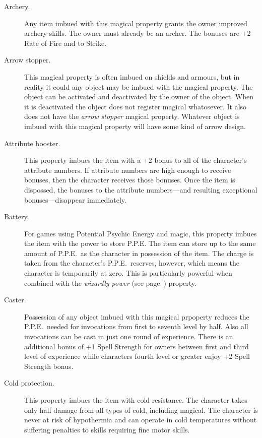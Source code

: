 \begin{description}
\item[Archery.]
Any item imbued with this magical
property grants the owner improved
archery skills.
The owner must already be an archer.
The bonuses are +2 Rate of Fire and to
Strike.

\item[Arrow stopper.]
This magical property is often imbued on
shields and armours, but in reality it could
any object may be imbued with the magical
property.
The object can be activated and deactivated
by the owner of the object.
When it is deactivated the object does not
register magical whatosever.
It also does not have the \emph{arrow stopper}
magical property.
Whatever object is imbued with this magical
property will have some kind of arrow design.

\item[Attribute booster.]
This property imbues the item with a +2 bonus to all of the character's attribute
numbers.
If attribute numbers are high enough to receive bonuses, then the character
receives those bonuses.
Once the item is dispossed, the bonuses to the attribute numbers---and
resulting exceptional bonuses---disappear immediately.

\item[Battery.]
For games using Potential Psychic Energy and magic,
this property imbues the item with the power to store P.P.E.
The item can store up to the same amount of P.P.E.\ as the character in possession of the
item.
The charge is taken from the character's P.P.E.\ reserves, however, which means the
character is temporarily at zero.
This is particularly powerful when combined with the \emph{wizardly power}
(see page~\pageref{mp:wizardly})
property.

\item[Caster.]
Possession of any object imbued with this
magical prpoperty reduces the P.P.E.\ needed
for invocations from first to seventh level
by half.
Also all invocations can be cast in just
one round of experience.
There is an additional bonus of
+1 Spell Strength for owners between
first and third level of experience
while characters fourth level or greater
enjoy +2 Spell Strength bonus.

\item[Cold protection.] This property imbues the item with cold resistance.
The character takes only half damage from all types of cold, including magical.
The character is never at risk of hypothermia and can operate in cold temperatures without
suffering penalties to skills requiring fine motor skills.


\end{description}
